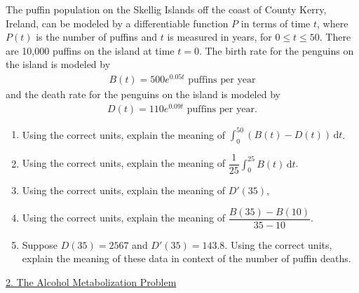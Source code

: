 The puffin population on the Skellig Islands off the coast of County Kerry, Ireland, can be modeled by a differentiable function $P$ in terms of time $t$, where $P(t)$ is the number of puffins and $t$ is measured in years, for $0 \leq t \leq 50$. There are 10,000 puffins on the island at time $t = 0$. The birth rate for the penguins on the island is modeled by \begin{align*}
    B(t) = 500e^{0.05t} \text{ puffins per year}
\end{align*}
and the death rate for the penguins on the island is modeled by \begin{align*}
    D(t) = 110e^{0.09t} \text{ puffins per year}.
\end{align*}
\begin{enumerate}[label=\hspace{11pt}(\alph*), align=left, leftmargin=*, labelsep=0.25em]
    \item Using the correct units, explain the meaning of $\int_0^{50} (B(t) - D(t)) \,\mathrm{d}t$. 
    \item Using the correct units, explain the meaning of $\dfrac{1}{25} \int_0^{25} B(t) \,\mathrm{d}t$. 
    \item Using the correct units, explain the meaning of $D'(35)$, 
    \item Using the correct units, explain the meaning of $\dfrac{B(35) - B(10)}{35 - 10}$. 
    \item Suppose $D(35) = 2567$ and $D'(35) = 143.8$. Using the correct units, explain the meaning of these data in context of the number of puffin deaths.
\end{enumerate} \vspace{11pt}

\begin{center}
    \underline{2. The Alcohol Metabolization Problem}
\end{center}

